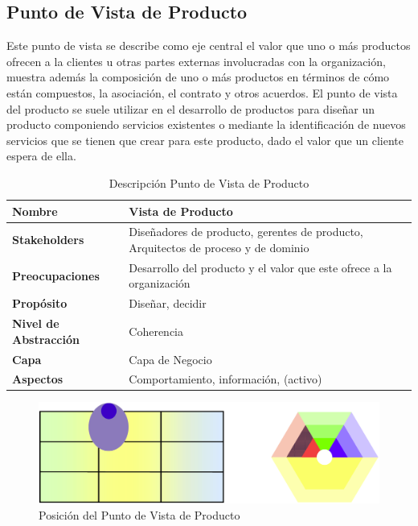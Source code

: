     \subsection{Punto de Vista de Producto}
    Este punto de vista se describe como eje central el valor que uno o más productos ofrecen a la clientes u otras partes externas involucradas con la organización, muestra   además la composición de uno o más productos en términos de cómo están compuestos, la asociación, el contrato y otros acuerdos. El punto de vista del producto se suele   utilizar en el desarrollo de productos para diseñar un producto componiendo servicios existentes o mediante la identificación de nuevos servicios que se tienen que crear para  este producto, dado el valor que un cliente espera de ella. \cite{ref9}
    \begin{table}[h]
      \centering
      \begin{tabular}{p{3.7cm}p{8cm}}
        \hline
        \textbf{Nombre} & \textbf{Vista de Producto} \\
        \hline
        \textbf{Stakeholders} & Diseñadores de producto, gerentes de producto, Arquitectos de proceso y de dominio \\
        \textbf{Preocupaciones} & Desarrollo del producto y el valor que este ofrece a la organización \\
        \textbf{Propósito} & Diseñar, decidir \\
        \textbf{Nivel de Abstracción} & Coherencia \\
        \textbf{Capa} & Capa de Negocio \\
        \textbf{Aspectos} & Comportamiento, información, (activo) \\
      \end{tabular}
      \caption{Descripción Punto de Vista de Producto}
      \label{tabla9}
    \end{table}
    \begin{figure}[h]
      \centering
      \includegraphics[scale=0.2]{Imagenes/Figuras/19}
      \caption{Posición del Punto de Vista de Producto}
      \label{figura19}
    \end{figure}
